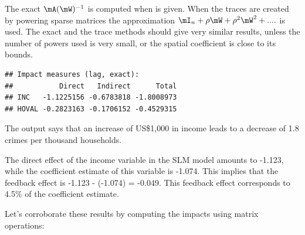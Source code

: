 The exact $\mA(\mW)^{-1}$ is computed when  is given. When the traces are created by powering sparse matrices the approximation $\mI_n + \rho\mW + \rho^2\mW^2 +....$ is used. The exact and the trace methods should give very similar results, unless the number of powers used is very small, or the spatial coefficient is close to its bounds. 

\begin{knitrout}
\color{fgcolor}\begin{kframe}
\begin{alltt}
  
\end{alltt}
\begin{verbatim}
## Impact measures (lag, exact):
##           Direct   Indirect      Total
## INC   -1.1225156 -0.6783818 -1.8008973
## HOVAL -0.2823163 -0.1706152 -0.4529315
\end{verbatim}
\end{kframe}
\end{knitrout}

The output says that an increase of US\$1,000 in income leads to a decrease of 1.8 crimes per thousand households. 

The direct effect of the income variable in the SLM model amounts to -1.123, while the coefficient estimate of this variable is -1.074. This implies that the feedback effect is -1.123 - (-1.074) = -0.049. This feedback effect corresponds to 4.5\% of the coefficient estimate. 

Let's corroborate these results by computing the impacts using matrix operations:

